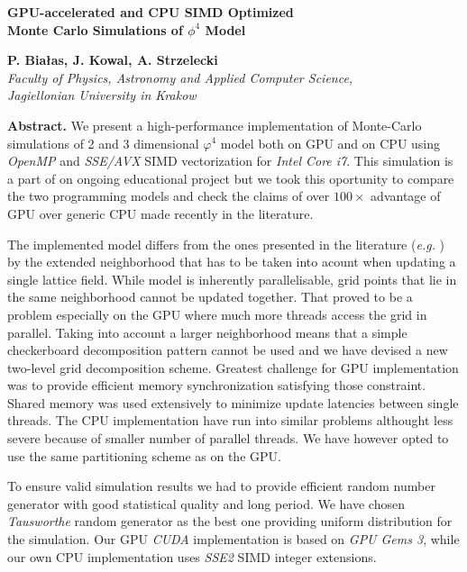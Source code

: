 \documentclass[11pt,a4paper]{article}
\begin{document}
\begin{samepage}
\begin{center}
{\Large{\bf GPU-accelerated and CPU SIMD Optimized \\ Monte Carlo Simulations of $\phi^4$ Model }}

\vspace {5mm}
{\bf P. Białas, J. Kowal, A. Strzelecki}\\
{\em Faculty of Physics, Astronomy and Applied Computer Science, \\ Jagiellonian University in Krakow }\\

\end{center}
\end{samepage}

{\bf Abstract.}  We present a high-performance implementation of
Monte-Carlo simulations of 2 and 3 dimensional $\varphi^4$ model
\cite{PhysRevE.64.066113} both on GPU and on CPU using \emph{OpenMP}
and \emph{SSE/AVX} SIMD vectorization for \emph{Intel Core i7}. This
simulation is a part of on ongoing educational project but we took
this oportunity to compare the two programming models and check the
claims of over $100\times$ advantage of GPU over generic CPU made
recently in the literature.

The implemented model differs from the ones presented in the
literature ({\em e.g.} \cite{Preis20094468}) by the extended
neighborhood that has to be taken into acount when updating a single
lattice field. While model is inherently parallelisable, grid points
that lie in the same neighborhood cannot be updated together. That
proved to be a problem especially on the GPU where much more threads
access the grid in parallel.  Taking into account a larger
neighborhood means that a simple checkerboard decomposition pattern
cannot be used and we have devised a new two-level grid decomposition
scheme.  Greatest challenge for GPU implementation was to provide
efficient memory synchronization satisfying those constraint.  Shared
memory was used extensively to minimize update latencies between
single threads.  The CPU implementation have run into similar problems
althought less severe because of smaller number of parallel
threads. We have however opted to use the same partitioning scheme as
on the GPU.

To ensure valid simulation results we had to provide efficient random
number generator with good statistical quality and long period. We
have chosen \emph{Tausworthe} random generator\cite{LEcuyer96} as the
best one providing uniform distribution for the simulation. Our GPU
\emph{CUDA} implementation is based on \emph{GPU Gems
  3}\cite{howes_thomas07}, while our own CPU implementation uses
\emph{SSE2} SIMD integer extensions.
\end{document}
